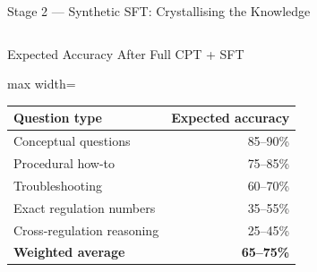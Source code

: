\documentclass[aspectratio=169,11pt]{beamer}
\begin{document}
\begin{frame}[shrink=18]{Stage 2 --- Synthetic SFT: Crystallising the Knowledge}
\begin{columns}[T]
\vspace{5pt}
\begin{block}{Expected Accuracy After Full CPT + SFT}
  \scriptsize
  \begin{adjustbox}{max width=\linewidth}
  \begin{tabular}{@{}lr@{}}
    \toprule
    \textbf{Question type} & \textbf{Expected accuracy}\\
    \midrule
    Conceptual questions & 85--90\%\\
    Procedural how-to & 75--85\%\\
    Troubleshooting & 60--70\%\\
    Exact regulation numbers & 35--55\%\\
    Cross-regulation reasoning & 25--45\%\\
    \textbf{Weighted average} & \textbf{65--75\%}\\
    \bottomrule
  \end{tabular}
  \end{adjustbox}
\end{block}

\end{columns}
\end{frame}
\end{document}
